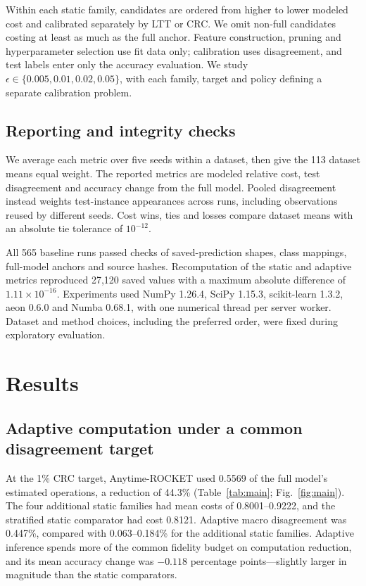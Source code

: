 \documentclass[pdflatex,sn-basic,Numbered]{sn-jnl}
\begin{document}
Within each static family, candidates are ordered from higher to lower modeled cost and calibrated separately by LTT or CRC. We omit non-full candidates costing at least as much as the full anchor. Feature construction, pruning and hyperparameter selection use fit data only; calibration uses disagreement, and test labels enter only the accuracy evaluation. We study $\epsilon\in\{0.005,0.01,0.02,0.05\}$, with each family, target and policy defining a separate calibration problem.

\subsection{Reporting and integrity checks}
We average each metric over five seeds within a dataset, then give the 113 dataset means equal weight. The reported metrics are modeled relative cost, test disagreement and accuracy change from the full model. Pooled disagreement instead weights test-instance appearances across runs, including observations reused by different seeds. Cost wins, ties and losses compare dataset means with an absolute tie tolerance of $10^{-12}$.

All 565 baseline runs passed checks of saved-prediction shapes, class mappings, full-model anchors and source hashes. Recomputation of the static and adaptive metrics reproduced 27,120 saved values with a maximum absolute difference of $1.11\times10^{-16}$. Experiments used NumPy 1.26.4, SciPy 1.15.3, scikit-learn 1.3.2, aeon 0.6.0 and Numba 0.68.1, with one numerical thread per server worker. Dataset and method choices, including the preferred order, were fixed during exploratory evaluation.

\section{Results}\label{sec:results}
\subsection{Adaptive computation under a common disagreement target}
At the 1\% CRC target, Anytime-ROCKET used 0.5569 of the full model's estimated operations, a reduction of 44.3\% (Table~\ref{tab:main}; Fig.~\ref{fig:main}). The four additional static families had mean costs of 0.8001--0.9222, and the stratified static comparator had cost 0.8121. Adaptive macro disagreement was 0.447\%, compared with 0.063--0.184\% for the additional static families. Adaptive inference spends more of the common fidelity budget on computation reduction, and its mean accuracy change was $-0.118$ percentage points---slightly larger in magnitude than the static comparators.
\end{document}
